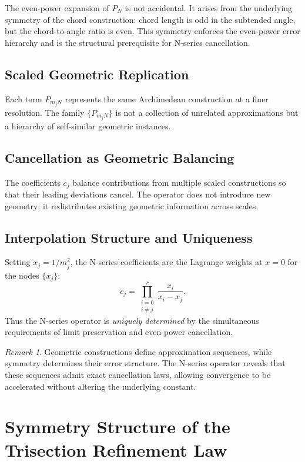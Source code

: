 \documentclass[12pt]{article}
\theoremstyle{remark}
\newtheorem{remark}{Remark}[section]
\begin{document}
The even-power expansion of $P_N$ is not accidental. It arises from the
underlying symmetry of the chord construction: chord length is odd in the
subtended angle, but the chord-to-angle ratio is even. This symmetry
enforces the even-power error hierarchy and is the structural prerequisite
for N-series cancellation.

\subsection{Scaled Geometric Replication}

Each term $P_{m_jN}$ represents the same Archimedean construction at a
finer resolution. The family $\{P_{m_jN}\}$ is not a collection of
unrelated approximations but a hierarchy of self-similar geometric instances.

\subsection{Cancellation as Geometric Balancing}

The coefficients $c_j$ balance contributions from multiple scaled
constructions so that their leading deviations cancel. The operator
does not introduce new geometry; it redistributes existing geometric
information across scales.

\subsection{Interpolation Structure and Uniqueness}

Setting $x_j = 1/m_j^2$, the N-series coefficients are the Lagrange
weights at $x=0$ for the nodes $\{x_j\}$:
\[
  c_j = \prod_{\substack{i=0\\i\neq j}}^r \frac{x_i}{x_i - x_j}.
\]
Thus the N-series operator is \emph{uniquely determined} by the simultaneous
requirements of limit preservation and even-power cancellation.

\begin{remark}
Geometric constructions define approximation sequences, while symmetry determines
their error structure. The N-series operator reveals that these sequences admit
exact cancellation laws, allowing convergence to be accelerated without altering
the underlying constant.
\end{remark}

\section{Symmetry Structure of the Trisection Refinement Law}
\end{document}
